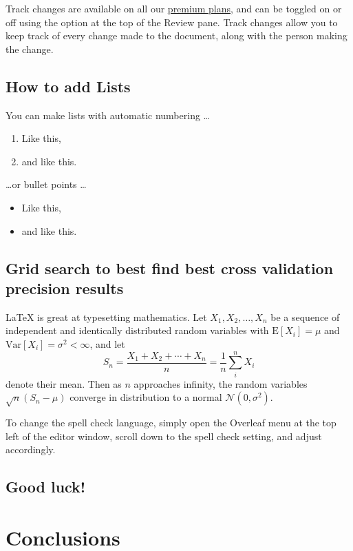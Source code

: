 \documentclass{article}
\begin{document}
Track changes are available on all our \href{https://www.overleaf.com/user/subscription/plans}{premium plans}, and can be toggled on or off using the option at the top of the Review pane. Track changes allow you to keep track of every change made to the document, along with the person making the change. 

\subsection{How to add Lists}

You can make lists with automatic numbering \dots

\begin{enumerate}
\item Like this,
\item and like this.
\end{enumerate}
\dots or bullet points \dots
\begin{itemize}
\item Like this,
\item and like this.
\end{itemize}

\subsection{Grid search to best find best cross validation precision results}

\LaTeX{} is great at typesetting mathematics. Let $X_1, X_2, \ldots, X_n$ be a sequence of independent and identically distributed random variables with $\text{E}[X_i] = \mu$ and $\text{Var}[X_i] = \sigma^2 < \infty$, and let
\[S_n = \frac{X_1 + X_2 + \cdots + X_n}{n}
      = \frac{1}{n}\sum_{i}^{n} X_i\]
denote their mean. Then as $n$ approaches infinity, the random variables $\sqrt{n}(S_n - \mu)$ converge in distribution to a normal $\mathcal{N}(0, \sigma^2)$.


To change the spell check language, simply open the Overleaf menu at the top left of the editor window, scroll down to the spell check setting, and adjust accordingly.

\subsection{Good luck!}

\section{Conclusions}



\end{document}
